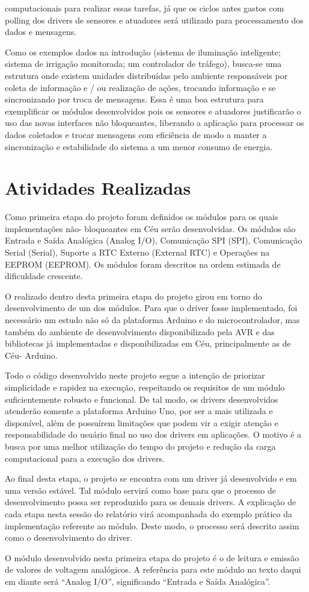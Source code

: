\documentclass{article}
\begin{document}
computacionais para realizar essas tarefas, já que os ciclos antes gastos com polling dos drivers de
sensores e atuadores será utilizado para processamento dos dados e mensagens.
\par Como os exemplos dados na introdução (sistema de iluminação inteligente; sistema de irrigação
monitorada; um controlador de tráfego), busca-se uma estrutura onde existem unidades distribuídas
pelo ambiente responsáveis por coleta de informação e / ou realização de ações, trocando
informação e se sincronizando por troca de mensagens. Essa é uma boa estrutura para exemplificar
os módulos desenvolvidos pois os sensores e atuadores justificarão o uso das novas interfaces não
bloqueantes, liberando a aplicação para processar os dados coletados e trocar mensagens com
eficiência de modo a manter a sincronização e estabilidade do sistema a um menor consumo de
energia.
\section{Atividades Realizadas}
\tab Como primeira etapa do projeto foram definidos os módulos para os quais implementações não-
bloqueantes em Céu serão desenvolvidas. Os módulos são Entrada e Saída Analógica (Analog
I/O), Comunicação SPI (SPI), Comunicação Serial (Serial), Suporte a RTC Externo
(External RTC) e Operações na EEPROM (EEPROM). Os módulos foram descritos na ordem
estimada de dificuldade crescente.
\par O realizado dentro desta primeira etapa do projeto girou em torno do desenvolvimento de um dos
módulos. Para que o driver fosse implementado, foi necessário um estudo não só da plataforma
Arduino e do microcontrolador, mas também do ambiente de desenvolvimento disponibilizado pela
AVR e das bibliotecas já implementadas e disponibilizadas em Céu, principalmente as de Céu-
Arduino.
\par Todo o código desenvolvido neste projeto segue a intenção de priorizar simplicidade e rapidez na
execução, respeitando os requisitos de um módulo suficientemente robusto e funcional. De tal
modo, os drivers desenvolvidos atenderão somente a plataforma Arduino Uno, por ser a mais
utilizada e disponível, além de possuírem limitações que podem vir a exigir atenção e
responsabilidade do usuário final no uso dos drivers em aplicações. O motivo é a busca por uma
melhor utilização do tempo do projeto e redução da carga computacional para a execução dos drivers.
\par Ao final desta etapa, o projeto se encontra com um driver já desenvolvido e em uma versão estável.
Tal módulo servirá como base para que o processo de desenvolvimento possa ser reproduzido para
os demais drivers. A explicação de cada etapa nesta sessão do relatório virá acompanhada do exemplo
prático da implementação referente ao módulo. Deste modo, o processo será descrito assim como o
desenvolvimento do driver.
\par O módulo desenvolvido nesta primeira etapa do projeto é o de leitura e emissão de valores de
voltagem analógicos. A referência para este módulo no texto daqui em diante será “Analog I/O”,
significando “Entrada e Saída Analógica”.
\end{document}
